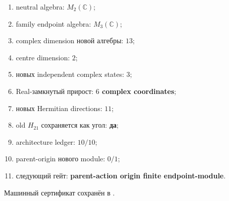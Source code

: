 \begin{protocol}\begin{enumerate}
\item neutral algebra: \textbf{$M_2(\mathbb C)$};
\item family endpoint algebra: \textbf{$M_3(\mathbb C)$};
\item complex dimension новой алгебры: \textbf{$13$};
\item centre dimension: \textbf{$2$};
\item новых independent complex states: \textbf{$3$};
\item Real-замкнутый прирост: \textbf{$6$ complex coordinates};
\item новых Hermitian directions: \textbf{$11$};
\item old $H_{21}$ сохраняется как угол: \textbf{да};
\item architecture ledger: \textbf{$10/10$};
\item parent-origin нового module: \textbf{$0/1$};
\item следующий гейт: \textbf{parent-action origin finite endpoint-module}.
\end{enumerate}\end{protocol}

Машинный сертификат сохранён в
.